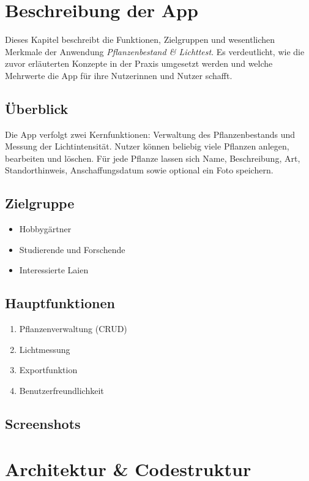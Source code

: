 \documentclass[14pt,a4paper]{report}
\begin{document}
\chapter{Beschreibung der App}
Dieses Kapitel beschreibt die Funktionen, Zielgruppen und wesentlichen Merkmale der Anwendung \textit{Pflanzenbestand \& Lichttest}. Es verdeutlicht, wie die zuvor erläuterten Konzepte in der Praxis umgesetzt werden und welche Mehrwerte die App für ihre Nutzerinnen und Nutzer schafft.

\section{Überblick}
Die App verfolgt zwei Kernfunktionen: Verwaltung des Pflanzenbestands und Messung der Lichtintensität. Nutzer können beliebig viele Pflanzen anlegen, bearbeiten und löschen. Für jede Pflanze lassen sich Name, Beschreibung, Art, Standorthinweis, Anschaffungsdatum sowie optional ein Foto speichern. 

\section{Zielgruppe}
\begin{itemize}
    \item Hobbygärtner
    \item Studierende und Forschende
    \item Interessierte Laien
\end{itemize}

\section{Hauptfunktionen}
\begin{enumerate}
    \item Pflanzenverwaltung (CRUD)
    \item Lichtmessung
    \item Exportfunktion
    \item Benutzerfreundlichkeit
\end{enumerate}

\section{Screenshots}

\chapter{Architektur \& Codestruktur}
\end{document}
